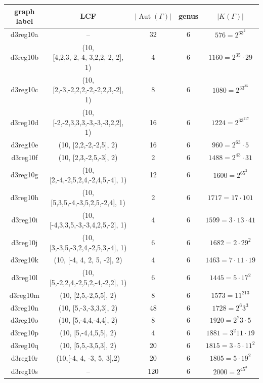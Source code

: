 \documentclass[12pt,letterpaper]{article}
\theoremstyle{definition}
\DeclareMathOperator{\Aut}{Aut}
\begin{document}
{\small{
\begin{center}
\begin{tabular}{c|c|c|c|c}
  graph label & LCF & $|\Aut(\Gamma)|$ & genus & $|K(\Gamma)|$ \\ \hline
  d3reg10a & -- & 32 & 6 & $576=2^63^2$ \\
  d3reg10b & (10, [4,2,3,-2,-4,-3,2,2,-2,-2], 1) & 4 & 6 & $1160=2^35\cdot 29$ \\
  d3reg10c & (10, [2,-3,-2,2,2,-2,-2,2,3,-2], 1) & 8 & 6 & $1080=2^33^35$ \\
  d3reg10d & (10, [-2,-2,3,3,3,-3,-3,-3,2,2], 1) & 16 & 6 & $1224=2^33^217$ \\ 
  d3reg10e & (10, [2,2,-2,-2,5], 2) & 16 & 6 & $960=2^63\cdot 5$ \\
  d3reg10f & (10, [2,3,-2,5,-3], 2) & 2 & 6 & $1488=2^43\cdot 31$ \\  
  d3reg10g & (10, [2,-4,-2,5,2,4,-2,4,5,-4], 1) & 12 & 6 & $1600=2^65^2$ \\  
  d3reg10h & (10, [5,3,5,-4,-3,5,2,5,-2,4], 1) & 2 & 6 & $1717=17\cdot 101$ \\  
  d3reg10i & (10, [-4,3,3,5,-3,-3,4,2,5,-2], 1) & 4 & 6 & $1599=3\cdot 13\cdot 41$ \\  
  d3reg10j & (10, [3,-3,5,-3,2,4,-2,5,3,-4], 1) & 6 & 6 & $1682 = 2\cdot 29^2$ \\  
  d3reg10k & (10, [-4, 4, 2, 5, -2], 2) & 4 & 6 & $1463=7\cdot 11\cdot 19$ \\  
  d3reg10l & (10, [5,-2,2,4,-2,5,2,-4,-2,2], 1) & 6 & 6 & $1445= 5\cdot 17^2$ \\  
  d3reg10m & (10, [2,5,-2,5,5], 2) & 8 & 6 & $1573=11^213$ \\
  d3reg10n & (10, [5,-3,-3,3,3], 2) & 48 & 6 & $1728 = 2^6 3^3$ \\    
  d3reg10o & (10, [5,-4,4,-4,4], 2) & 8  & 6 & $1920=2^7 3\cdot 5$ \\    
  d3reg10p & (10, [5,-4,4,5,5], 2) & 4  & 6 & $1881=3^2 11\cdot 19$ \\    
  d3reg10q & (10, [5,5,-3,5,3], 2)  & 20  & 6 & $1815=3\cdot 5\cdot 11^2$ \\    
  d3reg10r & (10,[-4, 4, -3, 5, 3],2) & 20  & 6 & $1805=5\cdot 19^2$ \\    
  d3reg10s & --  & 120  & 6 & $2000=2^45^3$ \\    
\end{tabular}
\end{center}  
}}
\end{document}
